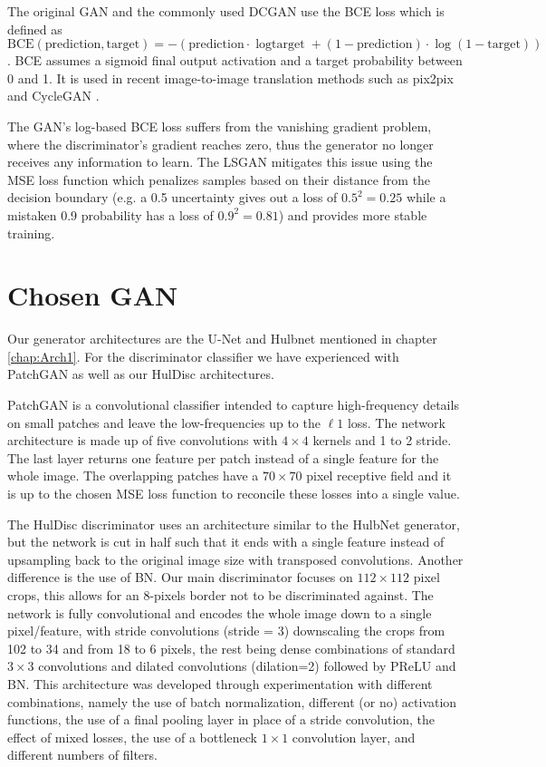 The original \ac{GAN} and the commonly used \ac{DCGAN} use the \ac{BCE} loss which is defined as $\text{BCE}(\text{prediction}, \text{target})=-(\text{prediction}\cdot{\log{\text{target}}}+(1-\text{prediction})\cdot \log{(1-\text{target})})$. \ac{BCE} assumes a sigmoid final output activation and a target probability between 0 and 1. It is used in recent image-to-image translation methods such as pix2pix \cite{pix2pix} and CycleGAN \cite{cyclegan}.

The \ac{GAN}'s log-based \ac{BCE} loss suffers from the vanishing gradient problem, where the discriminator's gradient reaches zero, thus the generator no longer receives any information to learn. The \acf{LSGAN} mitigates this issue using the \acl{MSE} loss function which penalizes samples based on their distance from the decision boundary (e.g. a 0.5 uncertainty gives out a loss of $0.5^2=0.25$ while a mistaken 0.9 probability has a loss of $0.9^2=0.81$) and provides more stable training.

\section{Chosen GAN}\label{HulDisc}

Our generator architectures are the U-Net \cite{unet} and Hulbnet mentioned in chapter \ref{chap:Arch1}. For the discriminator classifier we have experienced with PatchGAN \cite{pix2pix} as well as our HulDisc architectures.

PatchGAN is a convolutional classifier intended to capture high-frequency details on small patches and leave the low-frequencies up to the $\ell 1$ loss. The network architecture is made up of five convolutions with $4 \times 4$ kernels and 1 to 2 stride. The last layer returns one feature per patch instead of a single feature for the whole image. The overlapping patches have a $70 \times 70$ pixel receptive field and it is up to the chosen \ac{MSE} loss function to reconcile these losses into a single value.

The HulDisc discriminator uses an architecture similar to the HulbNet generator, but the network is cut in half such that it ends with a single feature instead of upsampling back to the original image size with transposed convolutions. Another difference is the use of \acl{BN}. Our main discriminator focuses on $112\times 112$ pixel crops, this allows for an 8-pixels border not to be discriminated against. The network is fully convolutional and encodes the whole image down to a single pixel/feature, with stride convolutions (stride = 3) downscaling the crops from 102 to 34 and from 18 to 6 pixels, the rest being dense combinations of standard $3\times 3$ convolutions and dilated convolutions (dilation=2) followed by \ac{PReLU} and \acl{BN}. This architecture was developed through experimentation with different combinations, namely the use of batch normalization, different (or no) activation functions, the use of a final pooling layer in place of a stride convolution, the effect of mixed losses, the use of a bottleneck $1\times 1$ convolution layer, and different numbers of filters.

